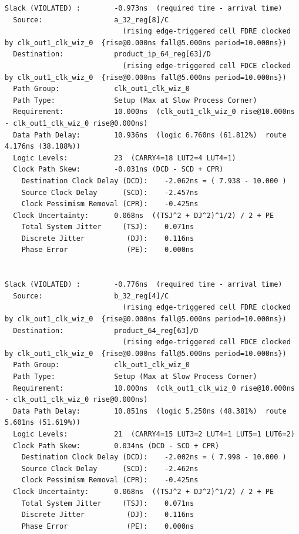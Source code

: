 \documentclass{report}
\begin{document}
\begin{verbatim}
Slack (VIOLATED) :        -0.973ns  (required time - arrival time)
  Source:                 a_32_reg[8]/C
                            (rising edge-triggered cell FDRE clocked by clk_out1_clk_wiz_0  {rise@0.000ns fall@5.000ns period=10.000ns})
  Destination:            product_ip_64_reg[63]/D
                            (rising edge-triggered cell FDCE clocked by clk_out1_clk_wiz_0  {rise@0.000ns fall@5.000ns period=10.000ns})
  Path Group:             clk_out1_clk_wiz_0
  Path Type:              Setup (Max at Slow Process Corner)
  Requirement:            10.000ns  (clk_out1_clk_wiz_0 rise@10.000ns - clk_out1_clk_wiz_0 rise@0.000ns)
  Data Path Delay:        10.936ns  (logic 6.760ns (61.812%)  route 4.176ns (38.188%))
  Logic Levels:           23  (CARRY4=18 LUT2=4 LUT4=1)
  Clock Path Skew:        -0.031ns (DCD - SCD + CPR)
    Destination Clock Delay (DCD):    -2.062ns = ( 7.938 - 10.000 ) 
    Source Clock Delay      (SCD):    -2.457ns
    Clock Pessimism Removal (CPR):    -0.425ns
  Clock Uncertainty:      0.068ns  ((TSJ^2 + DJ^2)^1/2) / 2 + PE
    Total System Jitter     (TSJ):    0.071ns
    Discrete Jitter          (DJ):    0.116ns
    Phase Error              (PE):    0.000ns


Slack (VIOLATED) :        -0.776ns  (required time - arrival time)
  Source:                 b_32_reg[4]/C
                            (rising edge-triggered cell FDRE clocked by clk_out1_clk_wiz_0  {rise@0.000ns fall@5.000ns period=10.000ns})
  Destination:            product_64_reg[63]/D
                            (rising edge-triggered cell FDCE clocked by clk_out1_clk_wiz_0  {rise@0.000ns fall@5.000ns period=10.000ns})
  Path Group:             clk_out1_clk_wiz_0
  Path Type:              Setup (Max at Slow Process Corner)
  Requirement:            10.000ns  (clk_out1_clk_wiz_0 rise@10.000ns - clk_out1_clk_wiz_0 rise@0.000ns)
  Data Path Delay:        10.851ns  (logic 5.250ns (48.381%)  route 5.601ns (51.619%))
  Logic Levels:           21  (CARRY4=15 LUT3=2 LUT4=1 LUT5=1 LUT6=2)
  Clock Path Skew:        0.034ns (DCD - SCD + CPR)
    Destination Clock Delay (DCD):    -2.002ns = ( 7.998 - 10.000 ) 
    Source Clock Delay      (SCD):    -2.462ns
    Clock Pessimism Removal (CPR):    -0.425ns
  Clock Uncertainty:      0.068ns  ((TSJ^2 + DJ^2)^1/2) / 2 + PE
    Total System Jitter     (TSJ):    0.071ns
    Discrete Jitter          (DJ):    0.116ns
    Phase Error              (PE):    0.000ns



\end{verbatim}
\end{document}
